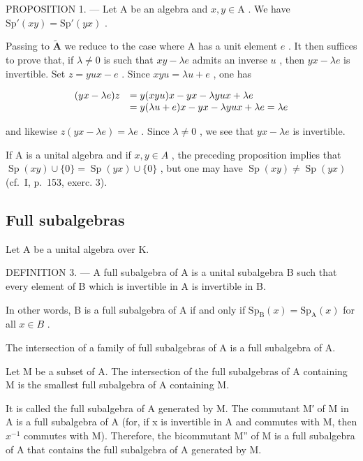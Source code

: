 PROPOSITION 1. --- Let A be an algebra and \(x, y \in \mathrm{A}\) . We have \(\mathrm{Sp}'(xy) = \mathrm{Sp}'(yx)\) .

Passing to \(\widetilde{\mathbf{A}}\) we reduce to the case where A has a unit element \(e\) . It then suffices to prove that, if \(\lambda \neq 0\) is such that \(xy - \lambda e\) admits an inverse \(u\) , then \(yx - \lambda e\) is invertible. Set \(z = yux - e\) . Since \(xyu = \lambda u + e\) , one has

\[
\begin{array}{r l} (y x - \lambda e) z & = y (x y u) x - y x - \lambda y u x + \lambda e \\ & = y (\lambda u + e) x - y x - \lambda y u x + \lambda e = \lambda e \end{array}
\]

and likewise \(z(yx - \lambda e) = \lambda e\) . Since \(\lambda \neq 0\) , we see that \(yx - \lambda e\) is invertible.

If A is a unital algebra and if \(x, y \in A\) , the preceding proposition implies that \(\operatorname{Sp}(xy) \cup \{0\} = \operatorname{Sp}(yx) \cup \{0\}\) , but one may have \(\operatorname{Sp}(xy) \neq \operatorname{Sp}(yx)\) (cf.~I, p.~153, exerc. 3).

\subsection{Full subalgebras}

Let A be a unital algebra over K.

DEFINITION 3. --- A full subalgebra of A is a unital subalgebra B such that every element of B which is invertible in A is invertible in B.

In other words, B is a full subalgebra of A if and only if \(\mathrm{Sp}_{\mathrm{B}}(x)=\mathrm{Sp}_{\mathrm{A}}(x)\) for all \(x\in B\) .

The intersection of a family of full subalgebras of A is a full subalgebra of A.

Let M be a subset of A. The intersection of the full subalgebras of A containing M is the smallest full subalgebra of A containing M.

It is called the full subalgebra of A generated by M. The commutant M′ of M in A is a full subalgebra of A (for, if x is invertible in A and commutes with M, then \(x^{-1}\) commutes with M). Therefore, the bicommutant M'' of M is a full subalgebra of A that contains the full subalgebra of A generated by M.

